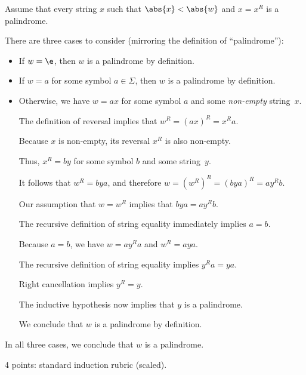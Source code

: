 \documentclass[11pt]{article}
\begin{document}
\begin{enumerate}
\begin{enumerate}
\begin{Solution}
Assume that every string $x$ such that $\abs{x} < \abs{w}$ and $x = x^R$ is a palindrome.

There are three cases to consider (mirroring the definition of “palindrome”):
\begin{itemize}\parskip0.25ex
\item 
If $w = \e$, then $w$ is a palindrome by definition.

\item 
If $w = a$ for some symbol $a\in\Sigma$, then $w$ is a palindrome by definition.

\item
Otherwise, we have $w = ax$ for some symbol $a$ and some \emph{non-empty} string~$x$.
  
The definition of reversal implies that $w^R = (ax)^R = x^R a$.

Because $x$ is non-empty, its reversal $x^R$ is also non-empty.

Thus, $x^R = by$ for some symbol $b$ and some string~$y$.

It follows that $w^R = bya$, and therefore $w = (w^R)^R = (bya)^R = a y^R b$.

\medskip
{}
\medskip

Our assumption that $w = w^R$ implies that $bya = a y^R b$.

The recursive definition of string equality immediately implies $a=b$.

\medskip
Because $a=b$, we have $w = ay^Ra$ and $w^R = a y a$.

The recursive definition of string equality implies $y^Ra = ya$.

Right cancellation implies $y^R = y$.

The inductive hypothesis now implies that $y$ is a palindrome.

\medskip
We conclude that $w$ is a palindrome by definition.
\end{itemize}
In all three cases, we conclude that $w$ is a palindrome.\needqedtrue\EOS
\end{Solution}
\unskip
\begin{rubric}
4 points: standard induction rubric (scaled).
\end{rubric}

\end{enumerate}

\end{enumerate}
 
\end{document}
